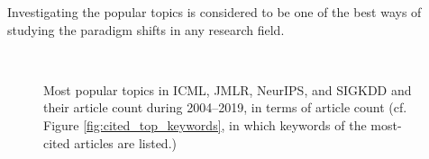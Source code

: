 Investigating the popular topics is considered to be one of the best ways of studying the paradigm shifts in any research field. 
\begin{figure}[!htbp]
	\begin{center}
	\\
	\end{center}
	\caption{Most popular topics in ICML, JMLR, NeurIPS, and SIGKDD and their article count during 2004--2019, in terms of article count (cf. Figure \ref{fig:cited_top_keywords}, in which keywords of the most-cited articles are listed.)}
	\label{fig:keywords_top}
\end{figure}


